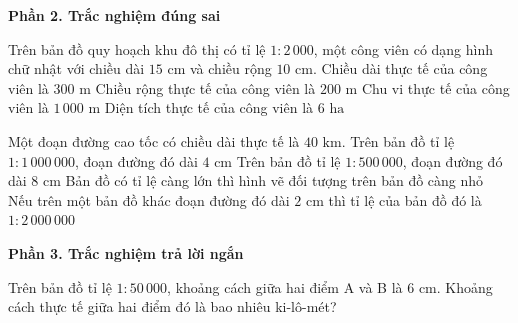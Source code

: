 \textbf{Phần 2. Trắc nghiệm đúng sai}

\begin{ex} %
Trên bản đồ quy hoạch khu đô thị có tỉ lệ $1 : 2\,000$, một công viên có dạng hình chữ nhật với chiều dài $15\text{ cm}$ và chiều rộng $10\text{ cm}$.
\choiceTF
{\True Chiều dài thực tế của công viên là $300\text{ m}$}
{\True Chiều rộng thực tế của công viên là $200\text{ m}$}
{\True Chu vi thực tế của công viên là $1\,000\text{ m}$}
{\True Diện tích thực tế của công viên là $6\text{ ha}$}
\end{ex}

\begin{ex} %
Một đoạn đường cao tốc có chiều dài thực tế là $40\text{ km}$.
\choiceTF
{\True Trên bản đồ tỉ lệ $1 : 1\,000\,000$, đoạn đường đó dài $4\text{ cm}$}
{\True Trên bản đồ tỉ lệ $1 : 500\,000$, đoạn đường đó dài $8\text{ cm}$}
{Bản đồ có tỉ lệ càng lớn thì hình vẽ đối tượng trên bản đồ càng nhỏ}
{\True Nếu trên một bản đồ khác đoạn đường đó dài $2\text{ cm}$ thì tỉ lệ của bản đồ đó là $1 : 2\,000\,000$}
\end{ex}

\textbf{Phần 3. Trắc nghiệm trả lời ngắn}

\begin{ex} %
Trên bản đồ tỉ lệ $1 : 50\,000$, khoảng cách giữa hai điểm A và B là $6\text{ cm}$. Khoảng cách thực tế giữa hai điểm đó là bao nhiêu ki-lô-mét?
\end{ex}

